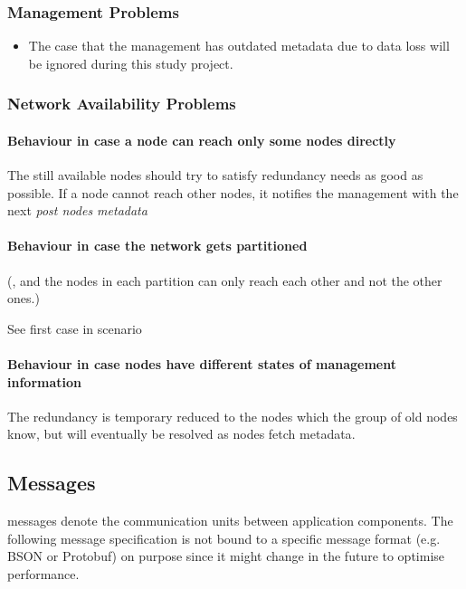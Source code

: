 \subsubsection{Management Problems}\label{sec:scenario-management-problems}
\begin{itemize}
    \item The case that the \gls{management} has outdated \gls{metadata} due to data loss will be ignored during this study project.
\end{itemize}

\subsubsection{Network Availability Problems}\label{sec:scenario-network-errors}
\paragraph{Behaviour in case a node can reach only some nodes directly}
The still available \glspl{node} should try to satisfy redundancy needs as good as possible.
If a \gls{node} cannot reach other \glspl{node}, it notifies the \gls{management} with the next \emph{post nodes metadata}

\paragraph{Behaviour in case the network gets partitioned}
(, and the \glspl{node} in each partition can only reach each other and not the other ones.)

See first case in scenario~

\paragraph{Behaviour in case nodes have different states of management information}
The redundancy is temporary reduced to the \glspl{node} which the group of old \glspl{node} know, but will eventually be resolved as \glspl{node} fetch \gls{metadata}.


\subsection{Messages}\label{sec:messages}

\Glspl{message} denote the communication units between application components. The following message specification is not bound to a specific message format (e.g. BSON or Protobuf) on purpose since it might change in the future to optimise performance.

